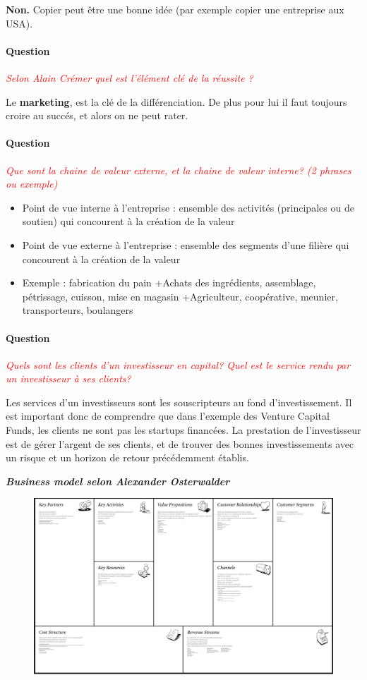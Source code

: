 \documentclass[12pt,oneside,a4paper]{article}
\newcommand{\question}[1]
{
\addtocounter{section}{1}
\paragraph*{Question \thesection}
\emph{\textcolor{red}{#1}}
}
\begin{document}
\textbf{Non.} Copier peut être une bonne idée (par exemple copier une entreprise aux USA).
\question{Selon Alain Crémer quel est l'élément clé de la réussite ?}

Le \textbf{marketing}, est la clé de la différenciation. De plus pour lui il faut toujours croire au succés, et alors on ne peut rater. 


\question{Que sont la chaine de valeur externe, et la chaine de valeur interne? (2 phrases ou exemple)}

\begin{itemize}[label=]
    \item Point de vue interne à l’entreprise : ensemble des activités (principales ou de soutien) qui concourent à la création de la valeur
    \item Point de vue externe à l’entreprise : ensemble des segments d’une filière qui concourent à la création de la  valeur
    \item Exemple : fabrication du pain
        \subitem +Achats des ingrédients, assemblage, pétrissage, cuisson, mise en magasin
        \subitem +Agriculteur, coopérative, meunier, transporteurs, boulangers
\end{itemize}
\question{Quels sont les clients d'un investisseur en capital? Quel est le service rendu par un investisseur à ses clients?}

Les services d'un investisseurs sont les souscripteurs au fond d'investissement. Il est important donc de comprendre que dans l'exemple des Venture Capital Funds, les clients ne sont pas les startups financées.
La prestation de l'investisseur est de gérer l'argent de ses clients, et de trouver des bonnes investissements avec un risque et un horizon de retour précédemment établis.

\textbf{\emph{Business model selon Alexander Osterwalder}}
\begin{figure}[h]
	\begin{center}
		\includegraphics[scale=0.5]{./img/im1.png}
	\end{center}
\end{figure}
\end{document}
